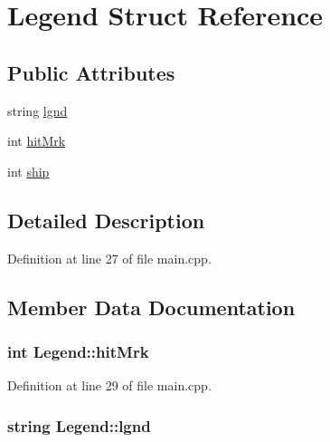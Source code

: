 \hypertarget{struct_legend}{\section{Legend Struct Reference}
\label{struct_legend}
}
\subsection*{Public Attributes}
\begin{DoxyCompactItemize}
\item 
string \hyperlink{struct_legend_aec74f6bcc74792152b73b2f20a00d6d3}{lgnd}
\item 
int \hyperlink{struct_legend_a9a061d9f5e944ca97358214e7c4e0d6b}{hit\+Mrk}
\item 
int \hyperlink{struct_legend_a637b6959e10df0779b48fdea71e7999d}{ship}
\end{DoxyCompactItemize}


\subsection{Detailed Description}


Definition at line 27 of file main.\+cpp.



\subsection{Member Data Documentation}
\hypertarget{struct_legend_a9a061d9f5e944ca97358214e7c4e0d6b}{
\subsubsection[{hit\+Mrk}]{\setlength{\rightskip}{0pt plus 5cm}int Legend\+::hit\+Mrk}}\label{struct_legend_a9a061d9f5e944ca97358214e7c4e0d6b}


Definition at line 29 of file main.\+cpp.

\hypertarget{struct_legend_aec74f6bcc74792152b73b2f20a00d6d3}{
\subsubsection[{lgnd}]{\setlength{\rightskip}{0pt plus 5cm}string Legend\+::lgnd}}\label{struct_legend_aec74f6bcc74792152b73b2f20a00d6d3}


